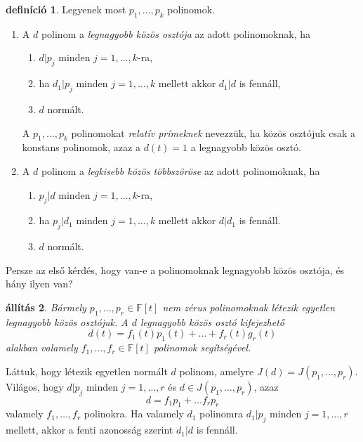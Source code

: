 \documentclass[9pt,showtrims]{memoir}
\makeatletter
\renewenvironment{proof}[1][\proofname]
    {\par\pushQED{\qed}%
    \normalfont \topsep6\p@\@plus6\p@\relax
    \trivlist
    \item[\hskip\labelsep
        \itshape
    #1\@addpunct{:}]\ignorespaces}
    {\popQED\endtrivlist\@endpefalse}
\theoremstyle{plain}
\newtheorem{proposition}{állítás}[chapter]
\theoremstyle{remark}
\theoremstyle{definition}
\newtheorem{definition}[proposition]{definíció}
\makeatother
\begin{document}
\begin{definition}
        Legyenek most $p_1,\dots,p_k$ polinomok. 
        \begin{enumerate}
            \item A $d$ polinom a \emph{legnagyobb közös osztója} az adott polinomoknak, 
                ha
                \begin{enumerate}
                    \item $d|p_j$ minden $j=1,\dots,k$-ra,
                    \item ha $d_1|p_j$ minden $j=1,\dots,k$ mellett akkor $d_1|d$ is fennáll,
                    \item $d$ normált.
                \end{enumerate}
                A $p_1,\dots,p_k$ polinomokat \emph{relatív prímeknek} nevezzük, 
                ha közös osztójuk csak a konstans polinomok, 
                azaz a $d\left( t \right)=1$ a legnagyobb közös osztó.
            \item A $d$ polinom a \emph{legkisebb közös többszöröse} az adott polinomoknak, 
                ha
                \begin{enumerate}
                    \item $p_j|d$ minden $j=1,\dots,k$-ra,
                    \item ha $p_j|d_1$ minden $j=1,\dots,k$ mellett akkor $d|d_1$ is fennáll.
                    \item $d$ normált.\qedhere
                \end{enumerate}
        \end{enumerate}
\end{definition}
Persze az első kérdés, hogy van-e a polinomoknak legnagyobb közös osztója, és hány ilyen van?
\begin{proposition}
    Bármely $p_1,\dots,p_r\in\mathbb{F}\left[ t \right]$ nem zérus polinomoknak
    létezik egyetlen legnagyobb közös osztójuk.
    A $d$ legnagyobb közös osztó kifejezhető
    \[
        d\left( t \right)=f_1\left( t \right)p_1\left( t \right)+
        \dots+
        f_r\left( t \right)g_r\left( t \right)
    \]
    alakban valamely $f_1,\dots,f_r\in\mathbb{F}\left[ t \right]$ polinomok segítségével.
\end{proposition}
\begin{proof}
    Láttuk, hogy létezik egyetlen normált $d$ polinom, amelyre $J\left( d \right)=J\left( p_1,\dots,p_r \right)$.
    Világos, hogy $d|p_j$ minden $j=1,\dots,r$ és $d\in J\left( p_1,\dots,p_r \right)$,
    azaz
    \[
        d=f_1p_1+\dots f_rp_r
    \]
    valamely $f_1,\dots,f_r$ polinokra.
    Ha valamely $d_1$ polinomra $d_1|p_j$ minden $j=1,\dots,r$ mellett,
    akkor a fenti azonosság szerint $d_1|d$ is fennáll.
\end{proof}
\end{document}
